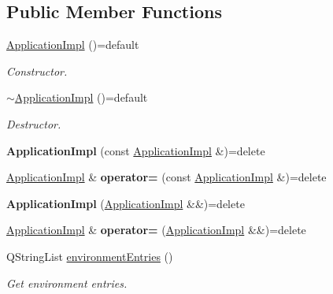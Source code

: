 \subsection*{Public Member Functions}
\begin{DoxyCompactItemize}
\item 
\hyperlink{class_mdt_1_1_application_impl_a512c94eac0af0b0fb9ecd76af49fa473}{Application\+Impl} ()=default
\begin{DoxyCompactList}\small\item\em Constructor. \end{DoxyCompactList}\item 
\hyperlink{class_mdt_1_1_application_impl_aacb32f587d7f8da64472026e8cf28f3c}{$\sim$\+Application\+Impl} ()=default
\begin{DoxyCompactList}\small\item\em Destructor. \end{DoxyCompactList}\item 
{\bfseries Application\+Impl} (const \hyperlink{class_mdt_1_1_application_impl}{Application\+Impl} \&)=delete\hypertarget{class_mdt_1_1_application_impl_a3b52a0b38ddb8032cdf38e518281fa47}{}\label{class_mdt_1_1_application_impl_a3b52a0b38ddb8032cdf38e518281fa47}

\item 
\hyperlink{class_mdt_1_1_application_impl}{Application\+Impl} \& {\bfseries operator=} (const \hyperlink{class_mdt_1_1_application_impl}{Application\+Impl} \&)=delete\hypertarget{class_mdt_1_1_application_impl_a00b1d241ed42d182046c1f24732d17b2}{}\label{class_mdt_1_1_application_impl_a00b1d241ed42d182046c1f24732d17b2}

\item 
{\bfseries Application\+Impl} (\hyperlink{class_mdt_1_1_application_impl}{Application\+Impl} \&\&)=delete\hypertarget{class_mdt_1_1_application_impl_a462a167732205be4879aaa897afd644e}{}\label{class_mdt_1_1_application_impl_a462a167732205be4879aaa897afd644e}

\item 
\hyperlink{class_mdt_1_1_application_impl}{Application\+Impl} \& {\bfseries operator=} (\hyperlink{class_mdt_1_1_application_impl}{Application\+Impl} \&\&)=delete\hypertarget{class_mdt_1_1_application_impl_adfdc2f1d0a9145df7431ec8a93a4ef6a}{}\label{class_mdt_1_1_application_impl_adfdc2f1d0a9145df7431ec8a93a4ef6a}

\item 
Q\+String\+List \hyperlink{class_mdt_1_1_application_impl_a50deab1146432008cfed699c817dd315}{environment\+Entries} ()
\begin{DoxyCompactList}\small\item\em Get environment entries. \end{DoxyCompactList}\end{DoxyCompactItemize}
